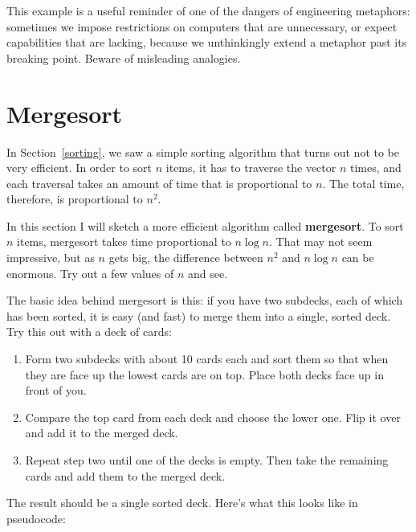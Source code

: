 This example is a useful reminder of one of the dangers of engineering
metaphors: sometimes we impose restrictions on computers that are
unnecessary, or expect capabilities that are lacking, because we
unthinkingly extend a metaphor past its breaking point.  Beware of
misleading analogies.


\section {Mergesort}

In Section~\ref{sorting}, we saw a simple sorting algorithm that turns
out not to be very efficient.  In order to sort $n$ items, it has to
traverse the vector $n$ times, and each traversal takes an amount of
time that is proportional to $n$.  The total time, therefore, is
proportional to $n^2$.

In this section I will sketch a more efficient algorithm called {\bf
mergesort}.  To sort $n$ items, mergesort takes time proportional to
$n \log n$.  That may not seem impressive, but as $n$ gets big, the
difference between $n^2$ and $n \log n$ can be enormous.  Try out a
few values of $n$ and see.

The basic idea behind mergesort is this: if you have two subdecks,
each of which has been sorted, it is easy (and fast) to merge them
into a single, sorted deck.  Try this out with a deck of cards:

\begin{enumerate}

\item Form two subdecks with about 10 cards each and sort
them so that when they are face up the lowest cards are on
top.  Place both decks face up in front of you.

\item Compare the top card from each deck and choose the
lower one.  Flip it over and add it to the merged deck.

\item Repeat step two until one of the decks is empty.
Then take the remaining cards and add them to the merged
deck.

\end{enumerate}

The result should be a single sorted deck.  Here's what this
looks like in pseudocode:

